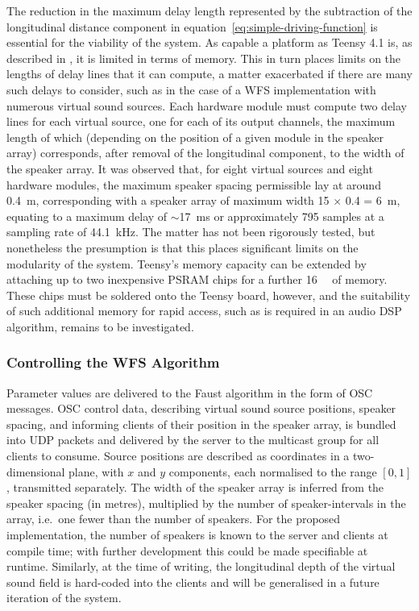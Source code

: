 The reduction in the maximum delay length represented by the subtraction of
the longitudinal distance component in
equation~\eqref{eq:simple-driving-function} is essential for the viability of
the system.
As capable a platform as Teensy 4.1 is, as described in
, it is limited in terms of memory.
This in turn places limits on the lengths of delay lines that it can compute,
a matter exacerbated if there are many such delays to consider, such as in the
case of a WFS implementation with numerous virtual sound sources.
Each hardware module must compute two delay lines for each virtual source, one
for each of its output channels, the maximum length of which (depending on
the position of a given module in the speaker array) corresponds, after removal
of the longitudinal component, to the width of the speaker array.
It was observed that, for eight virtual sources and eight hardware modules,
the maximum speaker spacing permissible lay at around \qty{.4}{\m},
corresponding with a speaker array of maximum width 15 $\times$ 0.4 =
\qty{6}{\m}, equating to a maximum delay of $\sim$\qty{17}{\ms} or
approximately 795 samples at a sampling rate of \qty{44.1}{\kHz}.
The matter has not been rigorously tested, but nonetheless the presumption is
that this places significant limits on the modularity of the system.
Teensy's memory capacity can be extended by attaching up to two inexpensive
PSRAM chips for a further \qty{16}{\mega\byte} of memory.
These chips must be soldered onto the Teensy board, however, and the suitability
of such additional memory for rapid access, such as is required in an audio DSP
algorithm, remains to be investigated.

\subsubsection{Controlling the WFS Algorithm}

Parameter values are delivered to the Faust algorithm in the form of OSC
messages.
OSC control data, describing virtual sound source positions, speaker spacing,
and informing clients of their position in the speaker array, is bundled into
UDP packets and delivered by the server to the multicast group for all clients
to consume.
Source positions are described as coordinates in a two-dimensional plane, with
$x$ and $y$ components, each normalised to the range $[0,1]$, transmitted
separately.
The width of the speaker array is inferred from the speaker spacing (in
metres), multiplied by the number of speaker-intervals in the array, i.e.\ one
fewer than the number of speakers.
For the proposed implementation, the number of speakers is known to the server
and clients at compile time; with further development this could be made
specifiable at runtime.
Similarly, at the time of writing, the longitudinal depth of the virtual
sound field is hard-coded into the clients and will be generalised in a future
iteration of the system.


